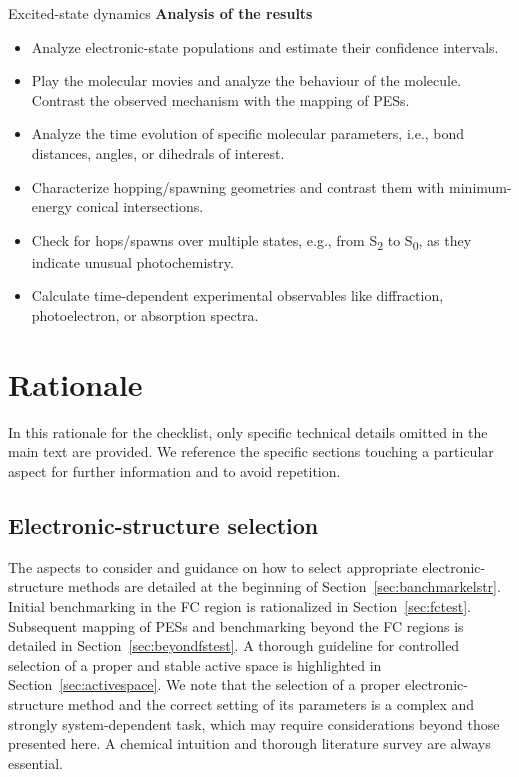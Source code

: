 \documentclass[9pt,bestpractices]{livecoms}
\begin{document}
\begin{Checklists*}[p!]
\begin{checklist}{Excited-state dynamics}
\textbf{Analysis of the results}

\begin{itemize}
    \item Analyze electronic-state populations and estimate their confidence intervals.
    \item Play the molecular movies and analyze the behaviour of the molecule. Contrast the observed mechanism with the mapping of PESs.
    \item Analyze the time evolution of specific molecular parameters, i.e., bond distances, angles, or dihedrals of interest.
    \item Characterize hopping/spawning geometries and contrast them with minimum-energy conical intersections.
    \item Check for hops/spawns over multiple states, e.g., from S\textsubscript{2} to S\textsubscript{0}, as they indicate unusual photochemistry.
    \item Calculate time-dependent experimental observables like diffraction, photoelectron, or absorption spectra.
\end{itemize}
\end{checklist}
\end{Checklists*}
\clearpage

\section{Rationale}

In this rationale for the checklist, only specific technical details omitted in the main text are provided. We reference the specific sections touching a particular aspect for further information and to avoid repetition.

\subsection{Electronic-structure selection}

The aspects to consider and guidance on how to select appropriate electronic-structure methods are detailed at the beginning of Section~\ref{sec:banchmarkelstr}. Initial benchmarking in the FC region is rationalized in Section~\ref{sec:fctest}. Subsequent mapping of PESs and benchmarking beyond the FC regions is detailed in Section~\ref{sec:beyondfstest}. A thorough guideline for controlled selection of a proper and stable active space is highlighted in Section~\ref{sec:activespace}. We note that the selection of a proper electronic-structure method and the correct setting of its parameters is a complex and strongly system-dependent task, which may require considerations beyond those presented here. A chemical intuition and thorough literature survey are always essential.
\end{document}
